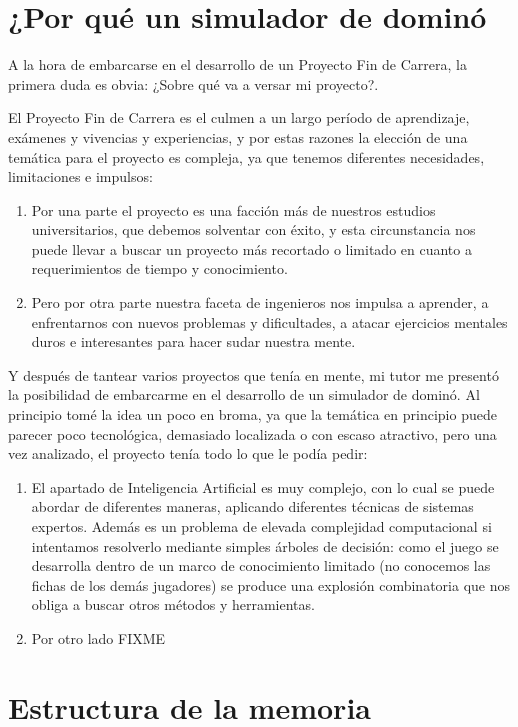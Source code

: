 

\section{¿Por qué un simulador de dominó}

A la hora de embarcarse en el desarrollo de un Proyecto Fin de Carrera, la primera duda es obvia: ¿Sobre qué va a versar mi proyecto?.

El Proyecto Fin de Carrera es el culmen a un largo período de aprendizaje, exámenes y vivencias y experiencias, y por estas razones la elección de una temática para el proyecto es compleja, ya que tenemos diferentes necesidades, limitaciones e impulsos:
\begin{enumerate}
    \item Por una parte el proyecto es una facción más de nuestros estudios universitarios, que debemos solventar con éxito, y esta circunstancia nos puede llevar a buscar un proyecto más recortado o limitado en cuanto a requerimientos de tiempo y conocimiento.
    \item Pero por otra parte nuestra faceta de ingenieros nos impulsa a aprender, a enfrentarnos con nuevos problemas y dificultades, a atacar ejercicios mentales duros e interesantes para hacer sudar nuestra mente.
\end{enumerate}

Y después de tantear varios proyectos que tenía en mente, mi tutor me presentó la posibilidad de embarcarme en el desarrollo de un simulador de dominó. Al principio tomé la idea un poco en broma, ya que la temática en principio puede parecer poco tecnológica, demasiado localizada o con escaso atractivo, pero una vez analizado, el proyecto tenía todo lo que le podía pedir:
\begin{enumerate}
    \item El apartado de Inteligencia Artificial es muy complejo, con lo cual se puede abordar de diferentes maneras, aplicando diferentes técnicas de sistemas expertos. Además es un problema de elevada complejidad computacional si intentamos resolverlo mediante simples árboles de decisión: como el juego se desarrolla dentro de un marco de conocimiento limitado (no conocemos las fichas de los demás jugadores) se produce una explosión combinatoria que nos obliga a buscar otros métodos y herramientas.
    \item Por otro lado FIXME
\end{enumerate}

\section{Estructura de la memoria}
